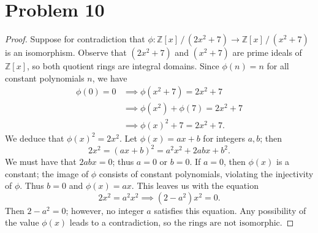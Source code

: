 \documentclass[11pt]{article}
\begin{document}

\section{Problem 10}

\begin{proof}
Suppose for contradiction that $\phi : \mathbb{Z}[x] \,/\, (2x^{2} + 7) \to \mathbb{Z}[x] \,/\, (x^{2} + 7)$ is an isomorphism. Observe that $(2x^{2} + 7)$ and $(x^{2} + 7)$ are prime ideals of $\mathbb{Z}[x]$, so both quotient rings are integral domains. Since $\phi(n) = n$ for all constant polynomials $n$, we have
\begin{align*}
  \phi(0) = 0 &\implies \phi(x^{2} + 7) = 2x^{2} + 7 \\
  &\implies \phi(x^{2}) + \phi(7) = 2x^{2} + 7 \\
  &\implies \phi(x)^{2} + 7 = 2x^{2} + 7.
\end{align*}
We deduce that $\phi(x)^{2} = 2x^{2}$. Let $\phi(x) = ax + b$ for integers $a, b$; then
\[
  2x^{2} = (ax + b)^{2} = a^{2}x^{2} + 2abx + b^{2}.
\]
We must have that $2abx = 0$; thus $a = 0$ or $b = 0$. If $a = 0$, then $\phi(x)$ is a constant; the image of $\phi$ consists of constant polynomials, violating the injectivity of $\phi$. Thus $b = 0$ and $\phi(x) = ax$. This leaves us with the equation
\[
  2x^{2} = a^{2}x^{2} \implies (2 - a^{2})x^{2} = 0.
\]
Then $2 - a^{2} = 0$; however, no integer $a$ satisfies this equation. Any possibility of the value $\phi(x)$ leads to a contradiction, so $\boxed{\text{the rings are not isomorphic}}$.
\end{proof}

\end{document}
